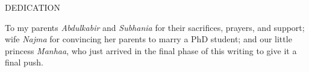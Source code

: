 \newpage
{}

\begin{center}
DEDICATION
\end{center}

\begin{center}
To my parents \textit{Abdulkabir} and \textit{Subhania} for their sacrifices, prayers, and support; wife \textit{Najma} for convincing her parents to marry a PhD student; and our little princess \textit{Manhaa}, who just arrived in the final phase of this writing to give it a final push.
\end{center}
